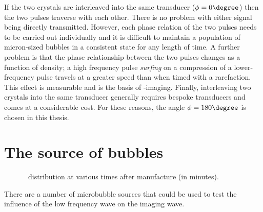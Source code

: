 If the two crystals are interleaved into the same transducer ($\phi = 0\degree$) then the two pulses traverse with each other.  
There is no problem with either signal being directly transmitted.
However, each phase relation of the two pulses needs to be carried out individually
and it is difficult to maintain a population of micron-sized bubbles in a consistent state for any length of time.
A further problem is that the phase relationship between the two pulses changes as a function of density;
a high frequency pulse {\em surfing} on a compression of a lower-frequency pulse travels at a greater speed than when timed with a rarefaction.
This effect is measurable and is the basis of {\surf}-imaging\cite{Anglesen2007}.
Finally, interleaving two crystals into the same transducer generally requires bespoke transducers
and comes at a considerable cost.
For these reasons, the angle $\phi = 180\degree$ is chosen in this thesis.


\section{The source of bubbles}\label{sec:WE:why_water}

\begin{figure}[t]%
  \centering
    
  \caption{
    \Sonovue\ distribution at various times after manufacture (in minutes).
  }
  \label{fig:sonovue_sizes}
\end{figure}


There are a number of microbubble sources that could be used to test the influence of the low frequency wave 
on the imaging wave.



